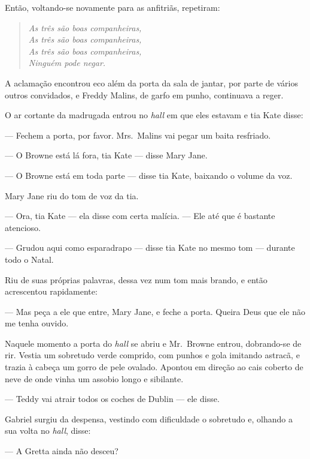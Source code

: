 Então, voltando-se novamente para as anfitriãs, repetiram:

\begin{verse}\itshape
As três são boas companheiras,\\
As três são boas companheiras,\\\clearpage
As três são boas companheiras,\\
Ninguém pode negar.
\end{verse}

A aclamação encontrou eco além da porta da sala de jantar, por parte de vários
outros convidados, e Freddy Malins, de garfo em punho, continuava a reger.

\smallskip

\noindent\dotfill

\smallskip

O ar cortante da madrugada entrou no \textit{hall} em que eles estavam e tia
Kate disse:

--- Fechem a porta, por favor.  Mrs.~Malins vai pegar um baita resfriado.

--- O Browne está lá fora, tia Kate --- disse Mary Jane.

--- O Browne está em toda parte --- disse tia Kate, baixando o volume da voz.

Mary Jane riu do tom de voz da tia.

--- Ora, tia Kate --- ela disse com certa malícia.  --- Ele até que é bastante
atencioso.

--- Grudou aqui como esparadrapo --- disse tia Kate no mesmo tom --- durante
todo o Natal.

Riu de suas próprias palavras, dessa vez num tom mais brando, e então
acrescentou rapidamente:

--- Mas peça a ele que entre, Mary Jane, e feche a porta.  Queira Deus que ele
não me tenha ouvido.

Naquele momento a porta do \textit{hall} se abriu e Mr.~Browne entrou,
dobrando-se de rir.  Vestia um sobretudo verde comprido, com punhos e gola
imitando astracã, e trazia à cabeça um gorro de pele ovalado.  Apontou em
direção ao cais coberto de neve de onde vinha um assobio longo e sibilante.

--- Teddy vai atrair todos os coches de Dublin --- ele disse.

Gabriel surgiu da despensa, vestindo com dificuldade o sobretudo e, olhando a
sua volta no \textit{hall}, disse:

--- A Gretta ainda não desceu?


